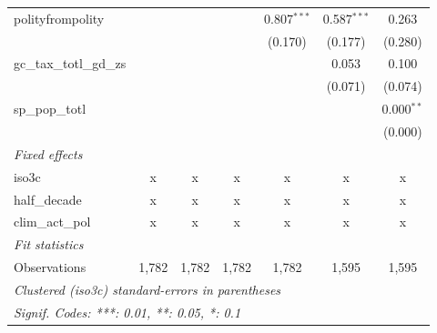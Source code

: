 \begin{tabular}{lcccccc}
   polityfrompolity                                               &         &              &              & 0.807$^{***}$ & 0.587$^{***}$  & 0.263\\   
                                                                  &         &              &              & (0.170)       & (0.177)        & (0.280)\\   
   gc\_tax\_totl\_gd\_zs                                          &         &              &              &               & 0.053          & 0.100\\   
                                                                  &         &              &              &               & (0.071)        & (0.074)\\   
   sp\_pop\_totl                                                  &         &              &              &               &                & 0.000$^{**}$\\   
                                                                  &         &              &              &               &                & (0.000)\\   
   \emph{Fixed effects}\\
   iso3c                                                          & x       & x            & x            & x             & x              & x\\  
   half\_decade                                                   & x       & x            & x            & x             & x              & x\\  
   clim\_act\_pol                                                 & x       & x            & x            & x             & x              & x\\  
   \midrule \emph{Fit statistics}\\
   Observations                                                   & 1,782   & 1,782        & 1,782        & 1,782         & 1,595          & 1,595\\  
   \midrule
   \multicolumn{7}{l}{\emph{Clustered (iso3c) standard-errors in parentheses}}\\
   \multicolumn{7}{l}{\emph{Signif. Codes: ***: 0.01, **: 0.05, *: 0.1}}\\
\end{tabular}
\par\endgroup


